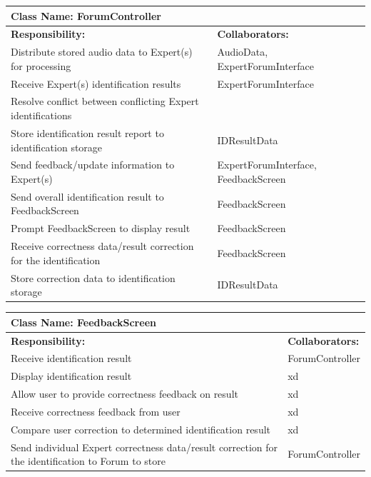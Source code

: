 \documentclass[]{article}
\begin{document}
\newpage
	\begin{table}[ht]
		\centering
		\begin{tabular}{|p{5cm}|p{5cm}|}
		\hline 
		 \multicolumn{2}{|l|}{\textbf{Class Name: ForumController}} \\
		\hline
		\textbf{Responsibility:} & \textbf{Collaborators:} \\
		\hline
		Distribute stored audio data to Expert(s) for processing & AudioData, ExpertForumInterface \\
		\hline
		Receive Expert(s) identification results & ExpertForumInterface \\
		\hline
		Resolve conflict between conflicting Expert identifications & \\
		\hline
		Store identification result report to identification storage & IDResultData \\
		\hline
		Send feedback/update information to Expert(s) & ExpertForumInterface, FeedbackScreen \\
		\hline
		Send overall identification result to FeedbackScreen & FeedbackScreen \\
		\hline
		Prompt FeedbackScreen to display result & FeedbackScreen \\
		\hline
		Receive correctness data/result correction for the identification & FeedbackScreen \\
		\hline
		Store correction data to identification storage & IDResultData \\
		\hline
		\end{tabular}
	\end{table}
	
	\begin{table}[ht]
		\centering
		\begin{tabular}{|p{5cm}|p{5cm}|}
		\hline 
		 \multicolumn{2}{|l|}{\textbf{Class Name: FeedbackScreen}} \\
		\hline
		\textbf{Responsibility:} & \textbf{Collaborators:} \\
		\hline
		Receive identification result & ForumController \\
		\hline
		Display identification result & xd \\
		\hline
		Allow user to provide correctness feedback on result & xd \\
		\hline
		Receive correctness feedback from user & xd \\
		\hline
		Compare user correction to determined identification result & xd \\
		\hline
		Send individual Expert correctness data/result correction for the identification to Forum to store & ForumController \\
		\hline
		\end{tabular}
	\end{table}
	
\end{document}
